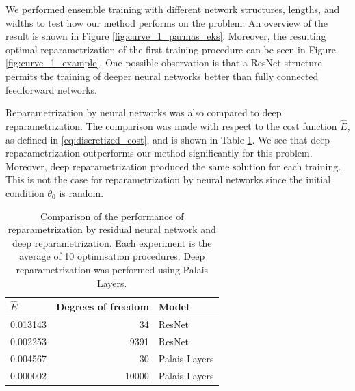 We performed ensemble training with different network structures, lengths, and widths to test how our method performs on the problem. An overview of the result is shown in Figure \ref{fig:curve_1_parmas_eks}. Moreover, the resulting optimal reparametrization of the first training procedure can be seen in Figure \ref{fig:curve_1_example}. One possible observation is that a ResNet structure permits the training of deeper neural networks better than fully connected feedforward networks.

Reparametrization by neural networks was also compared to deep reparametrization. The comparison was made with respect to the cost function \(\hat E\), as defined in \eqref{eq:discretized_cost}, and is shown in Table \ref{tab:comare_res_palais}. We see that deep reparametrization outperforms our method significantly for this problem. Moreover, deep reparametrization produced the same solution for each training. This is not the case for reparametrization by neural networks since the initial condition \(\theta_0\) is random.
\begin{table}[b]
    \centering
    \begin{tabular}{lrl}
        \toprule
        \(\hat{E} \) & Degrees of freedom & Model         \\
        \midrule
        0.013143     & 34                 & ResNet        \\
        0.002253     & 9391               & ResNet        \\
        0.004567     & 30                 & Palais Layers \\
        0.000002     & 10000              & Palais Layers \\
        \bottomrule
    \end{tabular}
    \caption{Comparison of the performance of reparametrization by residual neural network and deep reparametrization. Each experiment is the average of 10 optimisation procedures. Deep reparametrization was performed using Palais Layers.}\label{tab:comare_res_palais}
\end{table}
